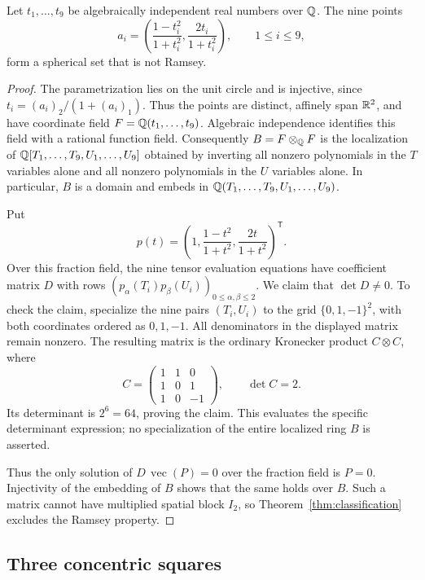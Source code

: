 \begin{proposition}\label{cons:nine}
Let $t_1,\ldots,t_9$ be algebraically independent real numbers over
$\mathbb Q$. The nine points
\[
 a_i=\left(\frac{1-t_i^2}{1+t_i^2},
                \frac{2t_i}{1+t_i^2}\right),\qquad 1\le i\le9,
\]
form a spherical set that is not Ramsey.
\end{proposition}
\begin{proof}
The parametrization lies on the unit circle and is injective, since
$t_i=(a_i)_2/(1+(a_i)_1)$. Thus the points are distinct, affinely span
$\mathbb R^2$, and have coordinate field $F=\mathbb Q(t_1,\ldots,t_9)$.
Algebraic independence identifies this field with a rational function
field. Consequently $B=F\otimes_\mathbb Q F$ is the localization of
$\mathbb Q[T_1,\ldots,T_9,U_1,\ldots,U_9]$ obtained by inverting all
nonzero polynomials in the $T$ variables alone and all nonzero
polynomials in the $U$ variables alone. In particular, $B$ is a domain
and embeds in $\mathbb Q(T_1,\ldots,T_9,U_1,\ldots,U_9)$.

Put
\[
 p(t)=\left(1,\frac{1-t^2}{1+t^2},\frac{2t}{1+t^2}\right)^{\mathsf T}.
\]
Over this fraction field, the nine tensor evaluation equations have
coefficient matrix $D$ with rows
$(p_\alpha(T_i)p_\beta(U_i))_{0\le\alpha,\beta\le2}$.
We claim that $\det D\ne0$. To check the claim, specialize the nine
pairs $(T_i,U_i)$ to the grid $\{0,1,-1\}^2$, with both coordinates
ordered as $0,1,-1$.
All denominators in the displayed matrix remain nonzero. The resulting
matrix is the ordinary Kronecker product $C\otimes C$, where
\[
 C=\begin{pmatrix}1&1&0\\1&0&1\\1&0&-1\end{pmatrix},
 \qquad \det C=2.
\]
Its determinant is $2^6=64$, proving the claim. This evaluates the
specific determinant expression; no specialization of the entire
localized ring $B$ is asserted.

Thus the only solution of $D\,\operatorname{vec}(P)=0$ over the
fraction field is $P=0$. Injectivity of the embedding of $B$ shows
that the same holds over $B$. Such a matrix cannot have multiplied
spatial block $I_2$, so Theorem~\ref{thm:classification} excludes the
Ramsey property.
\end{proof}

\subsection{Three concentric squares}

